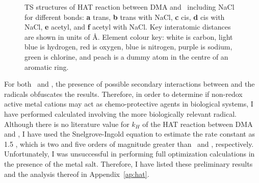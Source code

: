 \begin{doublespace}
\begin{figure}[!htbp]\ContinuedFloat
  \setcounter{subfigure}{4}

  \caption[TS structures of HAT reaction between DMA and \bno\ including
  NaCl.]{TS structures of HAT reaction between DMA and \bno\ including NaCl for
  different  bonds: \textbf{a} trans, \textbf{b} trans with NaCl,
  \textbf{c} cis, \textbf{d} cis with NaCl, \textbf{e} acetyl, and \textbf{f}
  acetyl with NaCl. Key interatomic distances are shown in units of \AA.
  Element colour key: white is carbon, light blue is hydrogen, red is oxygen,
  blue is nitrogen, purple is sodium, green is chlorine, and peach is a dummy
  atom in the centre of an aromatic ring.} \label{fig:dma-bno-ts}
\end{figure}

For both \cumo\ and \bno, the presence of possible secondary interactions
between  and the radicals obfuscates the results. Therefore, in order
to determine if non-redox active metal cations may act as chemo-protective
agents in biological systems, I have performed calculated involving the more
biologically relevant  radical. Although there is no literature value
for $k_H$ of the HAT reaction between DMA and , I have used the
Snelgrove-Ingold equation\cite{Snelgrove2001} to estimate the rate constant as
1.5 \Ms, which is two and five orders of magnitude greater than \bno\ and
\cumo, respectively. Unfortunately, I was unsuccessful in performing full
optimization calculations in the presence of the metal salt. Therefore, I have
listed these preliminary results and the analysis thereof in
Appendix~\ref{ap:hat}.



\end{doublespace}
